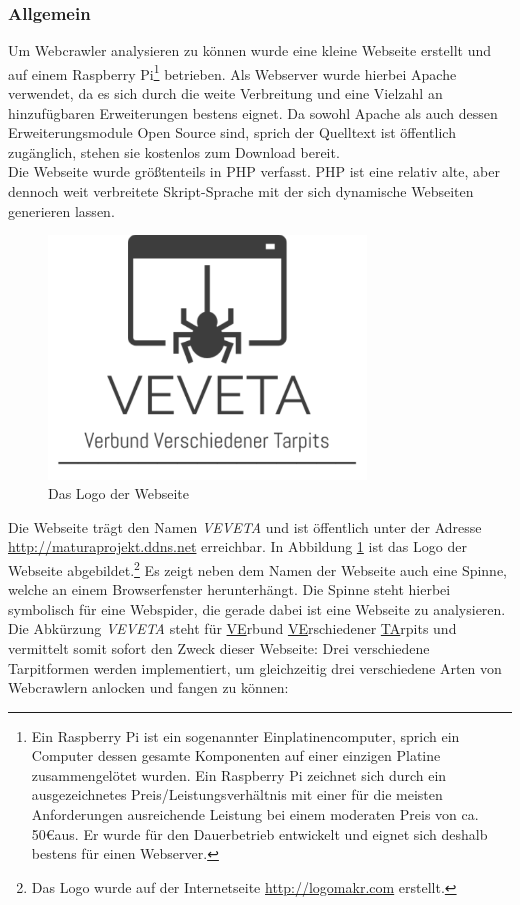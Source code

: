 \subsubsection{Allgemein}
Um Webcrawler analysieren zu können wurde eine kleine Webseite erstellt und auf einem Raspberry Pi\footnote{Ein Raspberry Pi ist ein sogenannter Einplatinencomputer, sprich ein Computer dessen gesamte Komponenten auf einer einzigen Platine zusammengelötet wurden. Ein Raspberry Pi zeichnet sich durch ein ausgezeichnetes Preis/Leistungsverhältnis mit einer für die meisten Anforderungen ausreichende Leistung bei einem moderaten Preis von ca. 50\euro\space aus. Er wurde für den Dauerbetrieb entwickelt und eignet sich deshalb bestens für einen Webserver.} betrieben. Als Webserver wurde hierbei Apache verwendet, da es sich durch die weite Verbreitung und eine Vielzahl an hinzufügbaren Erweiterungen bestens eignet. Da sowohl Apache als auch dessen Erweiterungsmodule Open Source sind, sprich der Quelltext ist öffentlich zugänglich, stehen sie kostenlos zum Download bereit.\\
Die Webseite wurde größtenteils in PHP verfasst. PHP ist eine relativ alte, aber dennoch weit verbreitete Skript-Sprache mit der sich dynamische Webseiten generieren lassen.\\
\begin{figure}[H]
	\centering
	\includegraphics[width=8.45cm]{img/logo-webseite.png}
	\caption{Das Logo der Webseite}
	\label{fig:logo_webseite}
\end{figure}
Die Webseite trägt den Namen \emph{VEVETA} und ist öffentlich unter der Adresse \url{http://maturaprojekt.ddns.net} erreichbar. In Abbildung \ref{fig:logo_webseite} ist das Logo der Webseite abgebildet.\footnote{Das Logo wurde auf der Internetseite \url{http://logomakr.com} erstellt.} Es zeigt neben dem Namen der Webseite auch eine Spinne, welche an einem Browserfenster herunterhängt. Die Spinne steht hierbei symbolisch für eine Webspider, die gerade dabei ist eine Webseite zu analysieren. Die Abkürzung \emph{VEVETA} steht für \underline{VE}rbund \underline{VE}rschiedener \underline{TA}rpits und vermittelt somit sofort den Zweck dieser Webseite: Drei verschiedene Tarpitformen werden implementiert, um gleichzeitig drei verschiedene Arten von Webcrawlern anlocken und fangen zu können:
